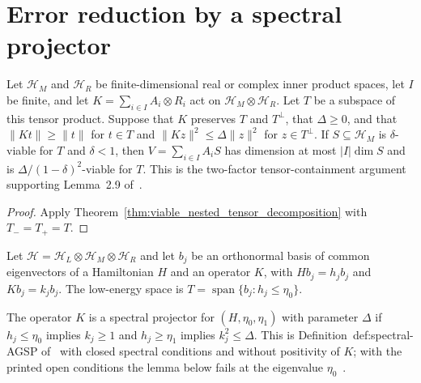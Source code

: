 \section{Error reduction by a spectral projector}

\begin{theorem}
    \label{thm:viable_tensor_decomposition}
    \leanok
    Let $\mathcal H_M$ and $\mathcal H_R$ be finite-dimensional real or complex
    inner product spaces, let $I$ be finite, and let
    $K=\sum_{i\in I}A_i\otimes R_i$ act on
    $\mathcal H_M\otimes\mathcal H_R$. Let $T$ be a subspace of this tensor
    product. Suppose that $K$ preserves $T$ and $T^\perp$, that $\Delta\ge0$,
    and that $\|Kt\|\ge\|t\|$ for $t\in T$ and
    $\|Kz\|^2\le\Delta\|z\|^2$ for $z\in T^\perp$.
    If $S\subseteq\mathcal H_M$ is $\delta$-viable for $T$ and $\delta<1$,
    then $V=\sum_{i\in I}A_iS$ has dimension at most $|I|\dim S$ and is
    $\Delta/(1-\delta)^2$-viable for $T$.
    This is the two-factor tensor-containment argument supporting
    Lemma~2.9 of~\cite[lines 606--622]{Arad2016RigorousRG}.
\end{theorem}

\begin{proof}\leanok
    Apply Theorem~\ref{thm:viable_nested_tensor_decomposition} with
    $T_-=T_+=T$.
\end{proof}

Let $\mathcal H=\mathcal H_L\otimes\mathcal H_M\otimes\mathcal H_R$ and let
$b_j$ be an orthonormal basis of common eigenvectors of a Hamiltonian $H$ and
an operator $K$, with $Hb_j=h_jb_j$ and $Kb_j=k_jb_j$. The low-energy space is
$T=\operatorname{span}\{b_j:h_j\le\eta_0\}$.

\begin{definition}
    \label{def:spectral_projector}
    \leanok
    The operator $K$ is a spectral projector for $(H,\eta_0,\eta_1)$ with
    parameter $\Delta$ if $h_j\le\eta_0$ implies $k_j\ge1$ and $h_j\ge\eta_1$
    implies $k_j^2\le\Delta$. This is Definition~def:spectral-AGSP
    of~\cite[lines 570--581]{Arad2016RigorousRG} with closed spectral
    conditions and without positivity of $K$; with the printed open
    conditions the lemma below fails at the eigenvalue
    $\eta_0$~\cite{gap:alvv16_spectral_projector_boundary}.
\end{definition}

